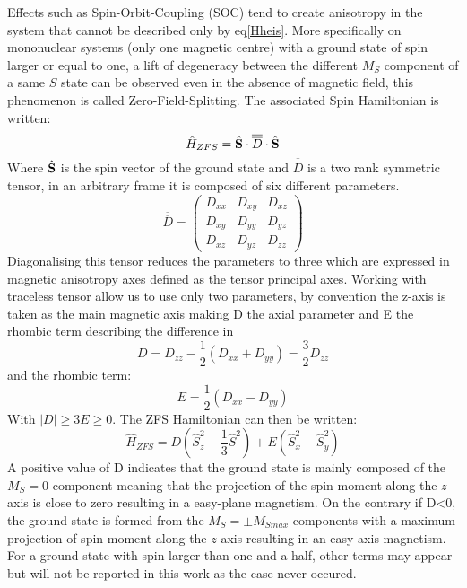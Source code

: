 \documentclass{article}
\begin{document}
\par Effects such as Spin-Orbit-Coupling (SOC) tend to create anisotropy in the system that cannot be described only by eq\ref{Hheis}. 
More specifically on mononuclear systems (only one magnetic centre) with a ground state of spin larger or equal to one, a lift of degeneracy between the different $M_S$ component of a same $S$ state can be observed even in the absence of magnetic field, this phenomenon is called Zero-Field-Splitting.
The associated Spin Hamiltonian is written:
\begin{equation}\label{SDS}
    \hat{H}_{ZFS}=\hat{\vb S} \cdot \overline{\overline{D}} \cdot \hat{\vb S}
\end{equation}
Where $\hat{\vb S}$ is the spin vector of the ground state and $\overline{\overline{D}}$ is a two rank symmetric tensor, in an arbitrary frame it is composed of six different parameters.
\begin{equation}
    \overline{\overline{D}}=\begin{pmatrix}
        D_{xx} & D_{xy} & D_{xz}\\
        D_{xy} & D_{yy} & D_{yz}\\
        D_{xz} & D_{yz} & D_{zz}
    \end{pmatrix}
\end{equation}
Diagonalising this tensor reduces the parameters to three which are expressed in magnetic anisotropy axes defined as the tensor principal axes. 
Working with traceless tensor allow us to use only two parameters, by convention the z-axis is taken as the main magnetic axis making D the axial parameter and E the rhombic term describing the difference in 
\begin{equation}\label{ParametreD}
    D=D_{zz}-\frac{1}{2}(D_{xx}+D_{yy})=\frac{3}{2}D_{zz}
\end{equation}
and the rhombic term:
\begin{equation}\label{ParametreE}
    E=\frac{1}{2}(D_{xx}-D_{yy})
\end{equation}
With $|D| \geq 3E \geq 0$. 
The ZFS Hamiltonian can then be written:
\begin{equation}  %
    \hat{H}_{ZFS}=D (\hat{S}_z^2-\frac{1}{3}\hat{S}^2)+E(\hat{S}_x^2-\hat{S}_y^2)
\end{equation}
A positive value of D indicates that the ground state is mainly composed of the $M_S=0$ component meaning that the projection of the spin moment along the $z$-axis is close to zero resulting in a easy-plane magnetism. 
On the contrary if D<0, the ground state is formed from the $M_S=\pm M_{Smax}$ components with a maximum projection of spin moment along the $z$-axis resulting in an easy-axis magnetism.
For a ground state with spin larger than one and a half, other terms may appear but will not be reported in this work as the case never occured.
\end{document}
